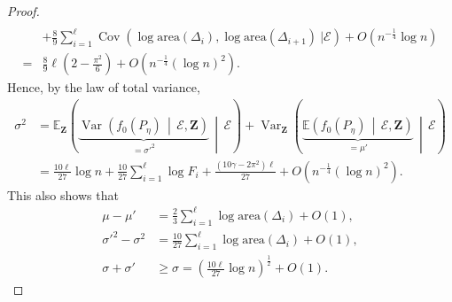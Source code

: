 \documentclass[10pt]{amsart}
\theoremstyle{definition}\newtheorem{defi}[theo]{Definition}\newtheorem{rema}[theo]{Remark}\newtheorem{exam}[theo]{Example}\newtheorem{exem}[theo]{Example}\newtheorem{nota}[theo]{Notation}
\newcommand{\var}{\operatorname{Var}}
\newcommand{\cov}{\operatorname{Cov}}
\newcommand{\bfZ}{\mathbf{Z}}
\newcommand{\bbE}{\mathbb{E}}
\newcommand{\clE}{\mathcal{E}}
\newcommand{\area}{\mathrm{area}}
\begin{document}
\begin{proof}
\begin{align*}
\\ & +
\frac 89 \sum_{i=1}^\ell \cov \left(\log {\area} (\Delta_i), \log {\area} (\Delta_{i+1}) \ \Big|\clE \right) + O\left(n^{- \frac 14 } \log n\right)
\\ = &
\frac 89 \ell \left(2- \frac{\pi^2}6 \right) + O\left(n^{-\frac 14} (\log n)^2\right).
\end{align*}
Hence, by the law of total variance,
\begin{align*}
\sigma^2 &=\bbE_ {\bfZ}\left(\underbrace{\var \left(f_0(P_{\eta})\,\middle|\,\clE, {\bfZ}\right)}_{= {\sigma '}^2}\, \middle|\, \clE\right) + \var_{\bfZ} \left(\underbrace{\bbE \left(f_0(P_{\eta})\,\middle|\,\clE, {\bfZ}\right)}_{= \mu'}\,\middle|\,\clE\right)\\
&= \frac{10 \ell}{27}\log n +\frac{10}{27}\sum_{i=1}^\ell \log F_i +
\frac{\left(10 \gamma -2 \pi^2\right)\ell }{27} + O\left(n^{-\frac 14} (\log n)^2\right).
\end{align*}
This also shows that
\begin{align}
\mu-\mu'& = \frac{2}{3}\sum_{i=1}^\ell \log{\area}(\Delta_i)+O(1),\label{eq:moments}
\\
\sigma'^2-\sigma^2 & = \frac{10}{27}\sum_{i=1}^\ell \log{\area}(\Delta_i)+O(1),\label{eq:variance1}
\\
\sigma+\sigma'& \geq \sigma = \left(\frac{10 \ell}{27}\log n\right)^{\frac 12} +O(1)\label{eq:variance2}
.
\end{align}


\end{proof}
\end{document}
